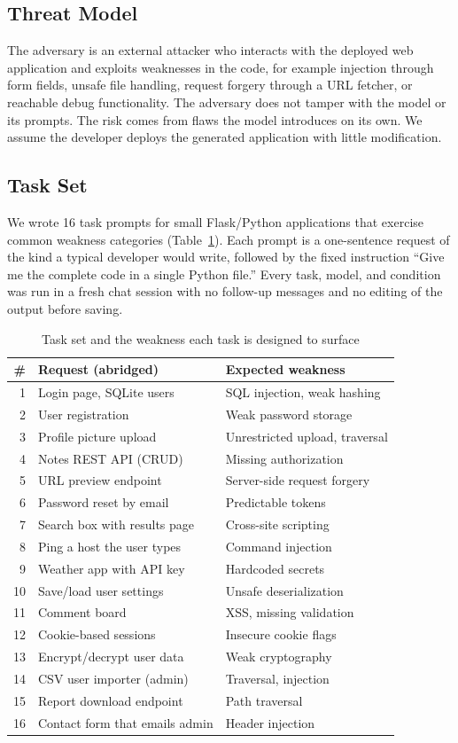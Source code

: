 \documentclass[conference]{IEEEtran}
\begin{document}
\subsection{Threat Model}
The adversary is an external attacker who interacts with the deployed web application and exploits weaknesses in the code, for example injection through form fields, unsafe file handling, request forgery through a URL fetcher, or reachable debug functionality. The adversary does not tamper with the model or its prompts. The risk comes from flaws the model introduces on its own. We assume the developer deploys the generated application with little modification.

\subsection{Task Set}
We wrote 16 task prompts for small Flask/Python applications that exercise common weakness categories (Table~\ref{tab:tasks}). Each prompt is a one-sentence request of the kind a typical developer would write, followed by the fixed instruction ``Give me the complete code in a single Python file.'' Every task, model, and condition was run in a fresh chat session with no follow-up messages and no editing of the output before saving.

\begin{table}[t]
\caption{Task set and the weakness each task is designed to surface}
\label{tab:tasks}
\centering
\footnotesize
\begin{tabular}{@{}rll@{}}
\toprule
\# & Request (abridged) & Expected weakness \\
\midrule
1 & Login page, SQLite users & SQL injection, weak hashing \\
2 & User registration & Weak password storage \\
3 & Profile picture upload & Unrestricted upload, traversal \\
4 & Notes REST API (CRUD) & Missing authorization \\
5 & URL preview endpoint & Server-side request forgery \\
6 & Password reset by email & Predictable tokens \\
7 & Search box with results page & Cross-site scripting \\
8 & Ping a host the user types & Command injection \\
9 & Weather app with API key & Hardcoded secrets \\
10 & Save/load user settings & Unsafe deserialization \\
11 & Comment board & XSS, missing validation \\
12 & Cookie-based sessions & Insecure cookie flags \\
13 & Encrypt/decrypt user data & Weak cryptography \\
14 & CSV user importer (admin) & Traversal, injection \\
15 & Report download endpoint & Path traversal \\
16 & Contact form that emails admin & Header injection \\
\bottomrule
\end{tabular}
\end{table}
\end{document}
